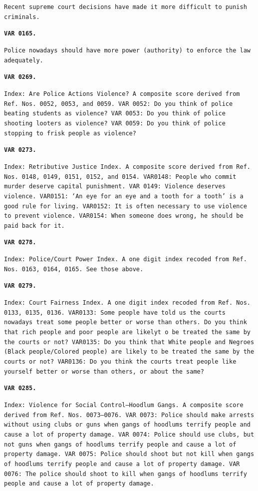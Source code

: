 \documentclass[12pt]{article}
\newenvironment{shift}{\begin{adjustwidth}{1cm}{}}{\end{adjustwidth}}
\begin{document}
\begin{shift}
 		\texttt{Recent supreme court decisions have made it more difficult to punish criminals.}


		\vspace{.05in}
		\texttt{\textbf{VAR 0165.}}

		\texttt{Police nowadays should have more power (authority) to enforce the law adequately.}

	 	\vspace{.05in}
		\texttt{\textbf{VAR 0269.}}

		\texttt{Index: Are Police Actions Violence?  A composite score derived from Ref. Nos. 0052, 0053, and 0059. VAR 0052: Do you think of police beating students as violence?  VAR 0053: Do you think of police shooting looters as violence?  VAR 0059: Do you think of police stopping to frisk people as violence?}


		\vspace{.05in}
		\texttt{\textbf{VAR 0273.}}

		\texttt{Index: Retributive Justice Index.  A composite score derived from Ref. Nos. 0148, 0149, 0151, 0152, and 0154.  VAR0148: People who commit murder deserve capital punishment.  VAR 0149: Violence deserves violence.  VAR0151: `An eye for an eye and a tooth for a tooth' is a good rule for living.  VAR0152: It is often necessary to use violence to prevent violence.  VAR0154: When someone does wrong, he should be paid back for it. }

		\vspace{.05in}
		\texttt{\textbf{VAR 0278.}}

		\texttt{Index: Police/Court Power Index.  A one digit index recoded from Ref. Nos. 0163, 0164, 0165.  See those above. }


		\vspace{.05in}
		\texttt{\textbf{VAR 0279.}}

		\texttt{Index: Court Fairness Index.  A one digit index recoded from Ref. Nos. 0133, 0135, 0136.  VAR0133: Some people have told us the courts nowadays treat some people better or worse than others.  Do you think that rich people and poor people are likelyt o be treated the same by the courts or not?  VAR0135: Do you think that White people and Negroes (Black people/Colored people)  are likely to be treated the same by the courts or not?  VAR0136: Do you think the courts treat people like yourself better or worse than others, or about the same? }

		\vspace{.05in}
		\texttt{\textbf{VAR 0285.}}

	 	\texttt{Index: Violence for Social Control--Hoodlum Gangs.  A composite score derived from Ref. Nos. 0073--0076. VAR 0073: Police should make arrests without using clubs or guns when gangs of hoodlums terrify people and cause a lot of property damage.  VAR 0074: Police should use clubs, but not guns when gangs of hoodlums terrify people and cause a lot of property damage.  VAR 0075: Police should shoot but not kill when gangs of hoodlums terrify people and cause a lot of property damage.  VAR 0076: The police should shoot to kill when gangs of hoodlums terrify people and cause a lot of property damage. }

	 \end{shift}
\end{document}
